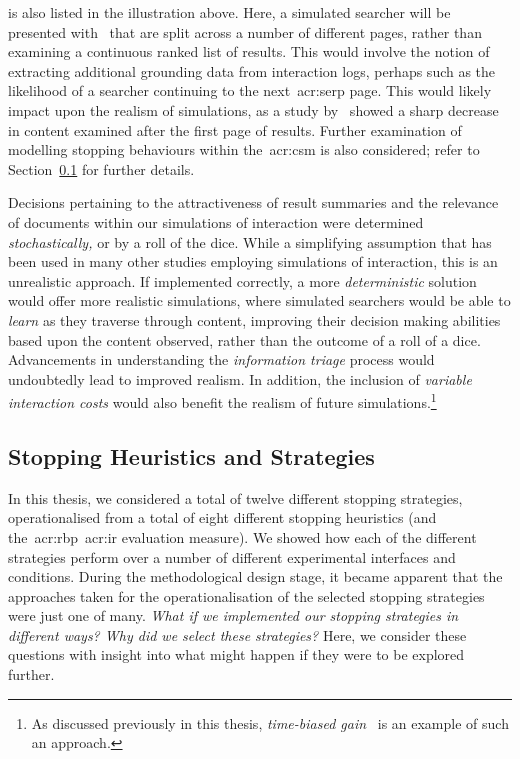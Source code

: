  is also listed in the illustration above. Here, a simulated searcher will be presented with~ that are split across a number of different pages, rather than examining a continuous ranked list of results. This would involve the notion of extracting additional grounding data from interaction logs, perhaps such as the likelihood of a searcher continuing to the next~\gls{acr:serp} page. This would likely impact upon the realism of simulations, as a study by~\cite{jansen2005analysis} showed a sharp decrease in content examined after the first page of results. Further examination of modelling stopping behaviours within the~\gls{acr:csm} is also considered; refer to Section~\ref{sec:conclusions:future:stopping} for further details.

 Decisions pertaining to the attractiveness of result summaries and the relevance of documents within our simulations of interaction were determined \emph{stochastically,} or by a roll of the dice. While a simplifying assumption that has been used in many other studies employing simulations of interaction, this is an unrealistic approach. If implemented correctly, a more \emph{deterministic} solution would offer more realistic simulations, where simulated searchers would be able to \emph{learn} as they traverse through content, improving their decision making abilities based upon the content observed, rather than the outcome of a roll of a dice. Advancements in understanding the \emph{information triage} process would undoubtedly lead to improved realism. In addition, the inclusion of \emph{variable interaction costs} would also benefit the realism of future simulations.\footnote{As discussed previously in this thesis, \emph{time-biased gain}~\citep{smucker2012tbg} is an example of such an approach.}

\subsection{Stopping Heuristics and Strategies}\label{sec:conclusions:future:stopping}
In this thesis, we considered a total of twelve different stopping strategies, operationalised from a total of eight different stopping heuristics (and the~\gls{acr:rbp}~\gls{acr:ir} evaluation measure). We showed how each of the different strategies perform over a number of different experimental interfaces and conditions. During the methodological design stage, it became apparent that the approaches taken for the operationalisation of the selected stopping strategies were just one of many. \emph{What if we implemented our stopping strategies in different ways? Why did we select these strategies?} Here, we consider these questions with insight into what might happen if they were to be explored further.

